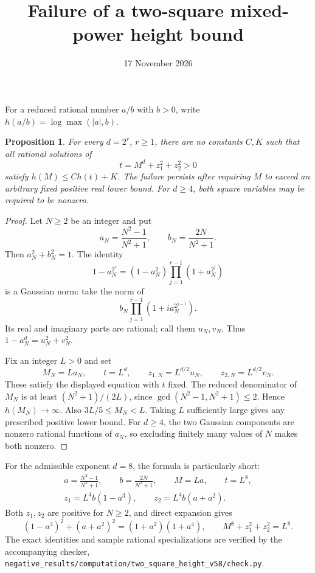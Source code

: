 \documentclass[11pt,a4paper]{article}
\title{Failure of a two-square mixed-power height bound}
\author{}\date{17 November 2026}
\newtheorem{proposition}{Proposition}
\begin{document}
\maketitle

For a reduced rational number $a/b$ with $b>0$, write
$h(a/b)=\log\max(|a|,b)$.

\begin{proposition}\label{prop:failure}
For every $d=2^r$, $r\ge1$, there are no constants $C,K$ such
that all rational solutions of
\[
                         t=M^d+z_1^2+z_2^2>0
\]
satisfy $h(M)\le C h(t)+K$. The failure persists after requiring
$M$ to exceed an arbitrary fixed positive real lower bound.
For $d\ge4$, both square variables may be required to be nonzero.
\end{proposition}
\begin{proof}
Let $N\ge2$ be an integer and put
\[
 a_N=\frac{N^2-1}{N^2+1},\qquad
 b_N=\frac{2N}{N^2+1}.
\]
Then $a_N^2+b_N^2=1$. The identity
\[
 1-a_N^{2^r}
  =(1-a_N^2)\prod_{j=1}^{r-1}(1+a_N^{2^j})
\]
is a Gaussian norm: take the norm of
\[
 b_N\prod_{j=1}^{r-1}(1+i a_N^{2^{j-1}}).
\]
Its real and imaginary parts are rational; call them $u_N,v_N$.
Thus $1-a_N^d=u_N^2+v_N^2$.

Fix an integer $L>0$ and set
\[
 M_N=L a_N,\qquad t=L^d,\qquad
 z_{1,N}=L^{d/2}u_N,\qquad z_{2,N}=L^{d/2}v_N.
\]
These satisfy the displayed equation with $t$ fixed. The reduced
denominator of $M_N$ is at least $(N^2+1)/(2L)$, since
$\gcd(N^2-1,N^2+1)\le2$. Hence $h(M_N)\to\infty$.
Also $3L/5\le M_N<L$. Taking $L$ sufficiently large gives any
prescribed positive lower bound. For $d\ge4$, the two Gaussian
components are nonzero rational functions of $a_N$, so excluding
finitely many values of $N$ makes both nonzero.
\end{proof}

For the admissible exponent $d=8$, the formula is particularly short:
\begin{equation}\label{eq:eight}
 \begin{gathered}
 a=\frac{N^2-1}{N^2+1},\qquad b=\frac{2N}{N^2+1},\qquad
 M=La,\qquad t=L^8,\\
 z_1=L^4 b(1-a^3),\qquad z_2=L^4 b(a+a^2).
 \end{gathered}
\end{equation}
Both $z_1,z_2$ are positive for $N\ge2$, and direct expansion gives
\[
 (1-a^3)^2+(a+a^2)^2=(1+a^2)(1+a^4),
 \qquad M^8+z_1^2+z_2^2=L^8.
\]
The exact identities and sample rational specializations are verified
by the accompanying checker,
\nolinkurl{negative_results/computation/two_square_height_v58/check.py}.
\end{document}
